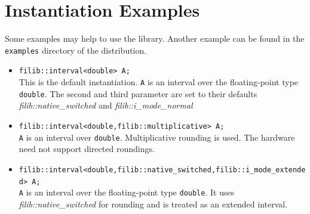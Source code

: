 \documentclass{report}
\newcommand{\EpsPicScaled}[2]{
  \begin{center}
    \leavevmode
    \renewcommand{\epsfsize}[2]{#2##1}
    \epsffile{#1.eps}
  \end{center}
}
\begin{document}
\begin{figure}
\begin{center}
\end{center}
\end{figure}

\section{Instantiation Examples}
	Some examples may help to use the library. Another example
can be found in the \texttt{examples} directory of the distribution.
		\begin{itemize}
		
			\item \texttt{filib::interval<double> A;}\\
This is the default instantiation.
				\texttt{A} is an  interval over the
		floating-point type
				\texttt{double}. The second and third parameter
		are set to their defaults
\textit{filib::native\_switched} and
\textit{filib::i\_mode\_normal}

			\item \texttt{filib::interval<double,filib::multiplicative> A;}\\
				\texttt{A} is an  interval over
				 \texttt{double}.  Multiplicative
				rounding is used. The hardware need
				not support directed roundings.

			\item \texttt{filib::interval<double,filib::native\_switched,filib::i\_mode\_extended> A;}\\
				\texttt{A} is an  interval over the
		floating-point type \texttt{double}. It uses 
    \textit{filib::native\_switched} for rounding and is treated as an extended interval.
		\end{itemize}
\end{document}
